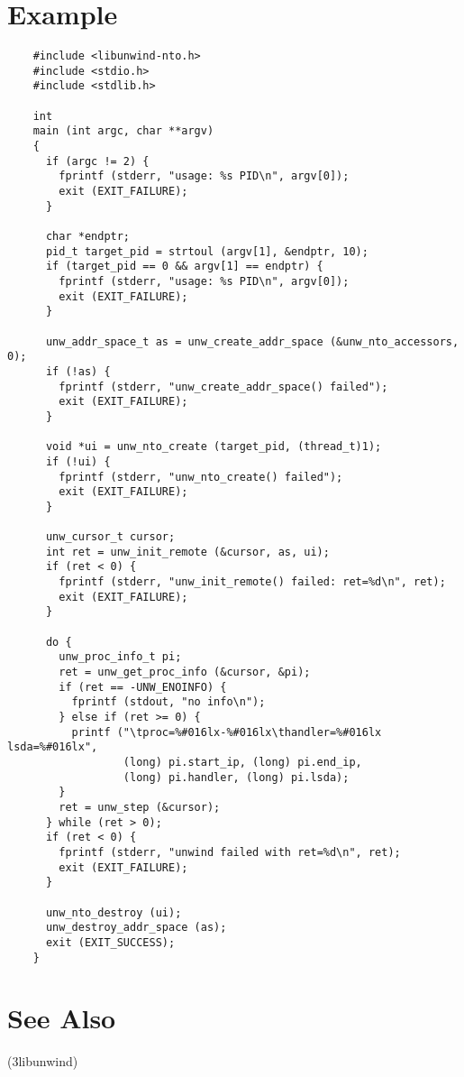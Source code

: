 \documentclass{article}
\begin{document}
\section{Example}
\begin{verbatim}
    #include <libunwind-nto.h>
    #include <stdio.h>
    #include <stdlib.h>

    int
    main (int argc, char **argv)
    {
      if (argc != 2) {
        fprintf (stderr, "usage: %s PID\n", argv[0]);
        exit (EXIT_FAILURE);
      }

      char *endptr;
      pid_t target_pid = strtoul (argv[1], &endptr, 10);
      if (target_pid == 0 && argv[1] == endptr) {
        fprintf (stderr, "usage: %s PID\n", argv[0]);
        exit (EXIT_FAILURE);
      }

      unw_addr_space_t as = unw_create_addr_space (&unw_nto_accessors, 0);
      if (!as) {
        fprintf (stderr, "unw_create_addr_space() failed");
        exit (EXIT_FAILURE);
      }

      void *ui = unw_nto_create (target_pid, (thread_t)1);
      if (!ui) {
        fprintf (stderr, "unw_nto_create() failed");
        exit (EXIT_FAILURE);
      }

      unw_cursor_t cursor;
      int ret = unw_init_remote (&cursor, as, ui);
      if (ret < 0) {
        fprintf (stderr, "unw_init_remote() failed: ret=%d\n", ret);
        exit (EXIT_FAILURE);
      }

      do {
        unw_proc_info_t pi;
        ret = unw_get_proc_info (&cursor, &pi);
        if (ret == -UNW_ENOINFO) {
          fprintf (stdout, "no info\n");
        } else if (ret >= 0) {
          printf ("\tproc=%#016lx-%#016lx\thandler=%#016lx lsda=%#016lx",
                  (long) pi.start_ip, (long) pi.end_ip,
                  (long) pi.handler, (long) pi.lsda);
        }
        ret = unw_step (&cursor);
      } while (ret > 0);
      if (ret < 0) {
        fprintf (stderr, "unwind failed with ret=%d\n", ret);
        exit (EXIT_FAILURE);
      }

      unw_nto_destroy (ui);
      unw_destroy_addr_space (as);
      exit (EXIT_SUCCESS);
    }
\end{verbatim}

\section{See Also}
(3libunwind)

\LatexManEnd
\end{document}
